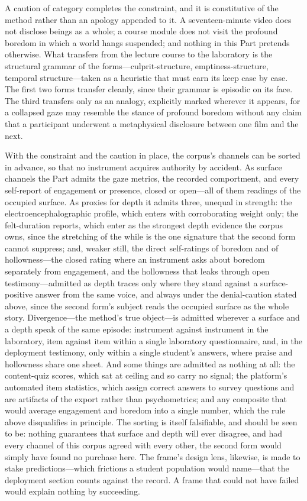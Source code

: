 \documentclass{article}
\begin{document}
A caution of category completes the constraint, and it is constitutive of the method rather than an apology appended to it. A seventeen-minute video does not disclose beings as a whole; a course module does not visit the profound boredom in which a world hangs suspended; and nothing in this Part pretends otherwise. What transfers from the lecture course to the laboratory is the structural grammar of the forms---culprit-structure, emptiness-structure, temporal structure---taken as a heuristic that must earn its keep case by case. The first two forms transfer cleanly, since their grammar is episodic on its face. The third transfers only as an analogy, explicitly marked wherever it appears, for a collapsed gaze may resemble the stance of profound boredom without any claim that a participant underwent a metaphysical disclosure between one film and the next.

With the constraint and the caution in place, the corpus's channels can be sorted in advance, so that no instrument acquires authority by accident. As surface channels the Part admits the gaze metrics, the recorded comportment, and every self-report of engagement or presence, closed or open---all of them readings of the occupied surface. As proxies for depth it admits three, unequal in strength: the electroencephalographic profile, which enters with corroborating weight only; the felt-duration reports, which enter as the strongest depth evidence the corpus owns, since the stretching of the while is the one signature that the second form cannot suppress; and, weaker still, the direct self-ratings of boredom and of hollowness---the closed rating where an instrument asks about boredom separately from engagement, and the hollowness that leaks through open testimony---admitted as depth traces only where they stand against a surface-positive answer from the same voice, and always under the denial-caution stated above, since the second form's subject reads the occupied surface as the whole story. Divergence---the method's true object---is admitted wherever a surface and a depth speak of the same episode: instrument against instrument in the laboratory, item against item within a single laboratory questionnaire, and, in the deployment testimony, only within a single student's answers, where praise and hollowness share one sheet. And some things are admitted as nothing at all: the content-quiz scores, which sat at ceiling and so carry no signal; the platform's automated item statistics, which assign correct answers to survey questions and are artifacts of the export rather than psychometrics; and any composite that would average engagement and boredom into a single number, which the rule above disqualifies in principle. The sorting is itself falsifiable, and should be seen to be: nothing guarantees that surface and depth will ever disagree, and had every channel of this corpus agreed with every other, the second form would simply have found no purchase here. The frame's design lens, likewise, is made to stake predictions---which frictions a student population would name---that the deployment section counts against the record. A frame that could not have failed would explain nothing by succeeding.
\end{document}
